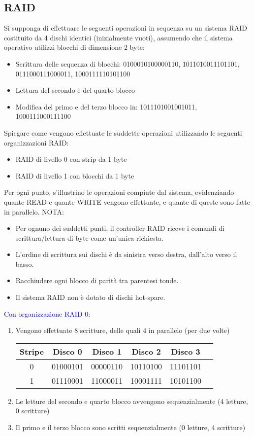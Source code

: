 \documentclass[12pt]{article}
\begin{document}
\subsection{RAID}
Si supponga di effettuare le seguenti operazioni in sequenza su un sistema RAID costituito da 4
dischi identici (inizialmente vuoti), assumendo che il sistema operativo utilizzi blocchi di
dimensione 2 byte:
\begin{itemize}
    \item Scrittura delle sequenza di blocchi: 0100010100000110, 1011010011101101, 0111000111000011, 1000111110101100
    \item Lettura del secondo e del quarto blocco
    \item Modifica del primo e del terzo blocco in: 1011101001001011, 1000111000111100
\end{itemize}
Spiegare come vengono effettuate le suddette operazioni utilizzando le seguenti organizzazioni
RAID:
\begin{itemize}
    \item RAID di livello 0 con strip da 1 byte
    \item RAID di livello 1 con blocchi da 1 byte
\end{itemize}
Per ogni punto, s'illustrino le operazioni compiute dal sistema, evidenziando quante READ e quante
WRITE vengono effettuate, e quante di queste sono fatte in parallelo.
NOTA:
\begin{itemize}
    \item Per ognuno dei suddetti punti, il controller RAID riceve i comandi di scrittura/lettura di byte come un'unica richiesta.
    \item L'ordine di scrittura sui dischi è da sinistra verso destra, dall'alto verso il basso.
    \item Racchiudere ogni blocco di parità tra parentesi tonde.
    \item Il sistema RAID non è dotato di dischi hot-spare.\\
\end{itemize}
\textcolor{blue}{Con organizzazione RAID 0:}
\begin{enumerate}
    \color{blue}
    \item Vengono effettuate 8 scritture, delle quali 4 in parallelo (per due volte)\\
    \begin{tabular}{|c|c|c|c|c|c|}
        \hline
        Stripe & Disco 0 & Disco 1 & Disco 2 & Disco 3\\
        \hline
        0 & 01000101 & 00000110 & 10110100 & 11101101 \\
        \hline
        1 & 01110001 & 11000011 & 10001111 & 10101100 \\
        \hline
    \end{tabular}
    \item Le letture del secondo e quarto blocco avvengono sequenzialmente (4 letture, 0 scritture)
    \item Il primo e il terzo blocco sono scritti sequenzialmente (0 letture, 4 scritture)
\end{enumerate}
\end{document}
